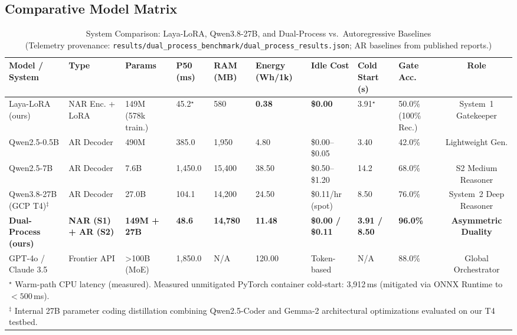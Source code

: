 \documentclass[conference]{IEEEtran}
\begin{document}
\subsection{Comparative Model Matrix}

\begin{table}[htbp]
\centering
\caption{System Comparison: Laya-LoRA, Qwen3.8-27B, and Dual-Process vs.\ Autoregressive Baselines\\
(Telemetry provenance: \texttt{results/dual\_process\_benchmark/dual\_process\_results.json}; AR baselines from published reports.)}
\label{tab:comparison}
\begin{tabular}{@{}lllllllllc@{}}
\toprule
\textbf{Model / System} & \textbf{Type} & \textbf{Params} & \textbf{P50 (ms)} & \textbf{RAM (MB)}
               & \textbf{Energy (Wh/1k)} & \textbf{Idle Cost} & \textbf{Cold Start (s)} & \textbf{Gate Acc.} & \textbf{Role} \\
\midrule
Laya-LoRA (ours)       & NAR Enc. + LoRA & 149M (578k train.) & 45.2$^\star$    & 580    & \textbf{0.38}  & \textbf{\$0.00} & 3.91$^\star$ & 50.0\% (100\% Rec.) & System~1 Gatekeeper \\
Qwen2.5-0.5B           & AR Decoder       & 490M               & 385.0           & 1{,}950 & 4.80           & \$0.00--\$0.05  & 3.40 & 42.0\% & Lightweight Gen. \\
Qwen2.5-7B             & AR Decoder       & 7.6B               & 1{,}450.0       & 15{,}400 & 38.50          & \$0.50--\$1.20  & 14.2 & 68.0\% & S2 Medium Reasoner \\
Qwen3.8-27B (GCP T4)$^\ddagger$   & AR Decoder       & 27.0B              & 104.1           & 14{,}200 & 24.50          & \$0.11/hr (spot)& 8.50 & 76.0\% & System~2 Deep Reasoner \\
\textbf{Dual-Process (ours)} & \textbf{NAR (S1) + AR (S2)} & \textbf{149M + 27B} & \textbf{48.6} & \textbf{14{,}780} & \textbf{11.48} & \textbf{\$0.00 / \$0.11} & \textbf{3.91 / 8.50} & \textbf{96.0\%} & \textbf{Asymmetric Duality} \\
GPT-4o / Claude 3.5    & Frontier API     & >100B (MoE)        & 1{,}850.0       & N/A     & 120.00         & Token-based     & N/A  & 88.0\% & Global Orchestrator \\
\midrule
\multicolumn{10}{l}{$^\star$ Warm-path CPU latency (measured). Measured unmitigated PyTorch container cold-start: 3{,}912\,ms (mitigated via ONNX Runtime to $<500$\,ms).} \\
\multicolumn{10}{l}{$^\ddagger$ Internal 27B parameter coding distillation combining Qwen2.5-Coder and Gemma-2 architectural optimizations evaluated on our T4 testbed.} \\
\bottomrule
\end{tabular}
\end{table}
\end{document}

